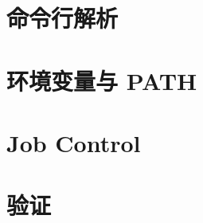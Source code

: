 \section{命令行解析}
\label{sec:ush-parser}


\section{环境变量与 PATH}
\label{sec:ush-env}


\section{Job Control}
\label{sec:ush-job}


\section{验证}
\label{sec:ush-verify}


